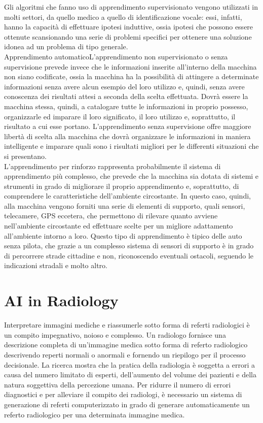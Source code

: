 \documentclass[12pt,a4paper]{report}
\begin{document}
Gli algoritmi che fanno uso di apprendimento supervisionato vengono utilizzati in molti settori, da quello medico a quello di identificazione vocale: essi, infatti, hanno la capacità di effettuare ipotesi induttive, ossia ipotesi che possono essere ottenute scansionando una serie di problemi specifici per ottenere una soluzione idonea ad un problema di tipo generale.
\\
Apprendimento automaticoL’apprendimento non supervisionato o senza supervisione prevede invece che le informazioni inserite all’interno della macchina non siano codificate, ossia la macchina ha la possibilità di attingere a determinate informazioni senza avere alcun esempio del loro utilizzo e, quindi, senza avere conoscenza dei risultati attesi a seconda della scelta effettuata. Dovrà essere la macchina stessa, quindi, a catalogare tutte le informazioni in proprio possesso, organizzarle ed imparare il loro significato, il loro utilizzo e, soprattutto, il risultato a cui esse portano. L’apprendimento senza supervisione offre maggiore libertà di scelta alla macchina che dovrà organizzare le informazioni in maniera intelligente e imparare quali sono i risultati migliori per le differenti situazioni che si presentano.
\\
L’apprendimento per rinforzo rappresenta probabilmente il sistema di apprendimento più complesso, che prevede che la macchina sia dotata di sistemi e strumenti in grado di migliorare il proprio apprendimento e, soprattutto, di comprendere le caratteristiche dell’ambiente circostante. In questo caso, quindi, alla macchina vengono forniti una serie di elementi di supporto, quali sensori, telecamere, GPS eccetera, che permettono di rilevare quanto avviene nell’ambiente circostante ed effettuare scelte per un migliore adattamento all’ambiente intorno a loro. Questo tipo di apprendimento è tipico delle auto senza pilota, che grazie a un complesso sistema di sensori di supporto è in grado di percorrere strade cittadine e non, riconoscendo eventuali ostacoli, seguendo le indicazioni stradali e molto altro.




\chapter{AI in Radiology}
Interpretare immagini mediche e riassumerle sotto forma di referti radiologici è un compito impegnativo, noioso e complesso. Un radiologo fornisce una descrizione completa di un'immagine medica sotto forma di referto radiologico descrivendo reperti normali o anormali e fornendo un riepilogo per il processo decisionale. La ricerca mostra che la pratica della radiologia è soggetta a errori a causa del numero limitato di esperti, dell'aumento del volume dei pazienti e della natura soggettiva della percezione umana. Per ridurre il numero di errori diagnostici e per alleviare il compito dei radiologi, è necessario un sistema di generazione di referti computerizzato in grado di generare automaticamente un referto radiologico per una determinata immagine medica.
\end{document}
